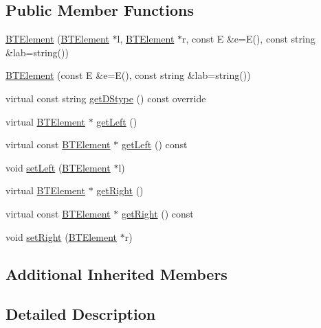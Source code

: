 \subsection*{Public Member Functions}
\begin{DoxyCompactItemize}
\item 
\hyperlink{classbridges_1_1_b_t_element_a8abf38e5d2d70c247de6a6fe6b90bf1b}{B\+T\+Element} (\hyperlink{classbridges_1_1_b_t_element}{B\+T\+Element} $\ast$l, \hyperlink{classbridges_1_1_b_t_element}{B\+T\+Element} $\ast$r, const E \&e=E(), const string \&lab=string())
\item 
\hyperlink{classbridges_1_1_b_t_element_afdc1d11d1d65b23007334d337c279c3a}{B\+T\+Element} (const E \&e=E(), const string \&lab=string())
\item 
virtual const string \hyperlink{classbridges_1_1_b_t_element_ad5b614c00d40a703be0e5a89f92df7c7}{get\+D\+Stype} () const  override
\item 
virtual \hyperlink{classbridges_1_1_b_t_element}{B\+T\+Element} $\ast$ \hyperlink{classbridges_1_1_b_t_element_ab5955c2611b6ae8c3c48508e3e983f87}{get\+Left} ()
\item 
virtual const \hyperlink{classbridges_1_1_b_t_element}{B\+T\+Element} $\ast$ \hyperlink{classbridges_1_1_b_t_element_a8f4783c03397db330cce37b3592a31ce}{get\+Left} () const 
\item 
void \hyperlink{classbridges_1_1_b_t_element_a86f58ed6311eeb7eddc76188c423781c}{set\+Left} (\hyperlink{classbridges_1_1_b_t_element}{B\+T\+Element} $\ast$l)
\item 
virtual \hyperlink{classbridges_1_1_b_t_element}{B\+T\+Element} $\ast$ \hyperlink{classbridges_1_1_b_t_element_a931de8a71c04479a4aa0885ecee2a855}{get\+Right} ()
\item 
virtual const \hyperlink{classbridges_1_1_b_t_element}{B\+T\+Element} $\ast$ \hyperlink{classbridges_1_1_b_t_element_a08b04d11b921dde0db7c5e20961d0e2d}{get\+Right} () const 
\item 
void \hyperlink{classbridges_1_1_b_t_element_a19cf1ad19b8dd33e0539d77ed7f5c7f6}{set\+Right} (\hyperlink{classbridges_1_1_b_t_element}{B\+T\+Element} $\ast$r)
\end{DoxyCompactItemize}
\subsection*{Additional Inherited Members}


\subsection{Detailed Description}
